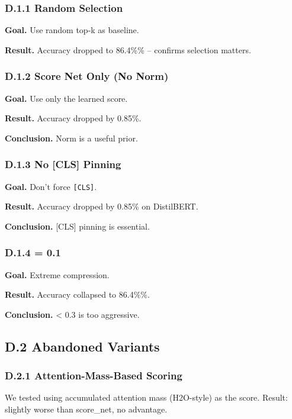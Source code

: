 \subsubsection{D.1.1 Random Selection}

\textbf{Goal.} Use random top-k as baseline.

\textbf{Result.} Accuracy dropped to 86.4\%\% -- confirms selection matters.

\subsubsection{D.1.2 Score Net Only (No Norm)}

\textbf{Goal.} Use only the learned score.

\textbf{Result.} Accuracy dropped by 0.85\%.

\textbf{Conclusion.} Norm is a useful prior.

\subsubsection{D.1.3 No [CLS] Pinning}

\textbf{Goal.} Don't force \texttt{[CLS]}.

\textbf{Result.} Accuracy dropped by 0.85\% on DistilBERT.

\textbf{Conclusion.} [CLS] pinning is essential.

\subsubsection{D.1.4   = 0.1}

\textbf{Goal.} Extreme compression.

\textbf{Result.} Accuracy collapsed to 86.4\%\%.

\textbf{Conclusion.}   \textless{} 0.3 is too aggressive.

\subsection{D.2 Abandoned Variants}

\subsubsection{D.2.1 Attention-Mass-Based Scoring}

We tested using accumulated attention mass (H2O-style) as the score. Result: 
slightly worse than score\_net, no advantage.

